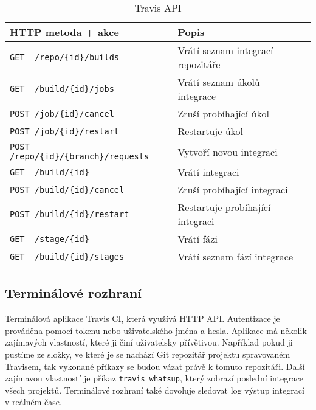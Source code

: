 \begin{table}[ht]
\centering
\fontsize{9.5}{11.5}\selectfont
\caption{Travis API}
\label{table:gitlab-api}
\begin{tabular}{|l|l|l|}
\hline
HTTP metoda + akce                                          & Popis \\ \hline
\verb|GET  /repo/{id}/builds|                               & Vrátí seznam integrací repozitáře      \\ \hline
\verb|GET  /build/{id}/jobs|                                & Vrátí seznam úkolů integrace      \\ \hline
\verb|POST /job/{id}/cancel|                                & Zruší probíhající úkol      \\ \hline
\verb|POST /job/{id}/restart|                               & Restartuje úkol      \\ \hline
\verb|POST /repo/{id}/{branch}/requests|                    & Vytvoří novou integraci      \\ \hline
\verb|GET  /build/{id}|                                     & Vrátí integraci      \\ \hline
\verb|POST /build/{id}/cancel|                              & Zruší probíhající integraci      \\ \hline
\verb|POST /build/{id}/restart|                             & Restartuje probíhající integraci      \\ \hline
\verb|GET  /stage/{id}|                                     & Vrátí fázi      \\ \hline
\verb|GET  /build/{id}/stages|                              & Vrátí seznam fází integrace      \\ \hline
\end{tabular}
\end{table}

\subsection{Terminálové rozhraní}

Terminálová aplikace Travis CI, která využívá HTTP API.
Autentizace je prováděna pomocí tokenu nebo uživatelského jména a hesla.
Aplikace má několik zajímavých vlastností, které ji činí uživatelsky přívětivou.
Například pokud ji pustíme ze složky, ve které je se nachází Git repozitář projektu spravovaném Travisem, tak vykonané příkazy se budou vázat právě k tomuto repozitáři.
Další zajímavou vlastností je příkaz \verb|travis whatsup|, který zobrazí poslední integrace všech projektů.
Terminálové rozhraní také dovoluje sledovat log výstup integrací v reálném čase. 


